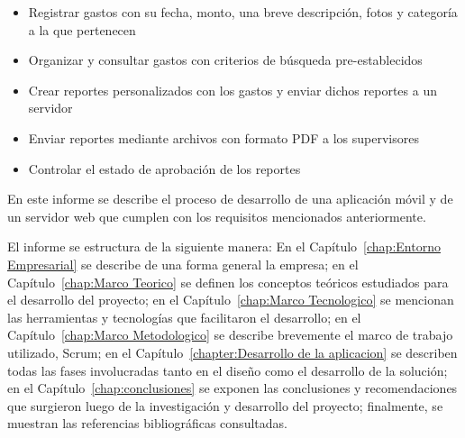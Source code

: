 \begin{itemize}
\item Registrar gastos con su fecha, monto, una breve descripción, fotos y categoría a la que pertenecen
\item Organizar y consultar gastos con criterios de búsqueda pre-establecidos
\item Crear reportes personalizados con los gastos y enviar dichos reportes a un servidor
\item Enviar reportes mediante archivos con formato PDF a los supervisores
\item Controlar el estado de aprobación de los reportes
\end{itemize}

En este informe se describe el proceso de desarrollo de una aplicación móvil y de un servidor web que cumplen con los requisitos mencionados anteriormente.

El informe se estructura de la siguiente manera: En el Capítulo~\ref{chap:Entorno Empresarial} se describe de una forma general la empresa; en el Capítulo~\ref{chap:Marco Teorico} se definen los conceptos teóricos estudiados para el desarrollo del proyecto; en el Capítulo~\ref{chap:Marco Tecnologico} se mencionan las herramientas y tecnologías que facilitaron el desarrollo; en el Capítulo~\ref{chap:Marco Metodologico} se describe brevemente el marco de trabajo utilizado, Scrum; en el Capítulo~\ref{chapter:Desarrollo de la aplicacion} se describen todas las fases involucradas tanto en el diseño como el desarrollo de la solución; en el Capítulo~\ref{chap:conclusiones} se exponen las conclusiones y recomendaciones que surgieron luego de la investigación y desarrollo del proyecto; finalmente, se muestran las referencias bibliográficas consultadas.